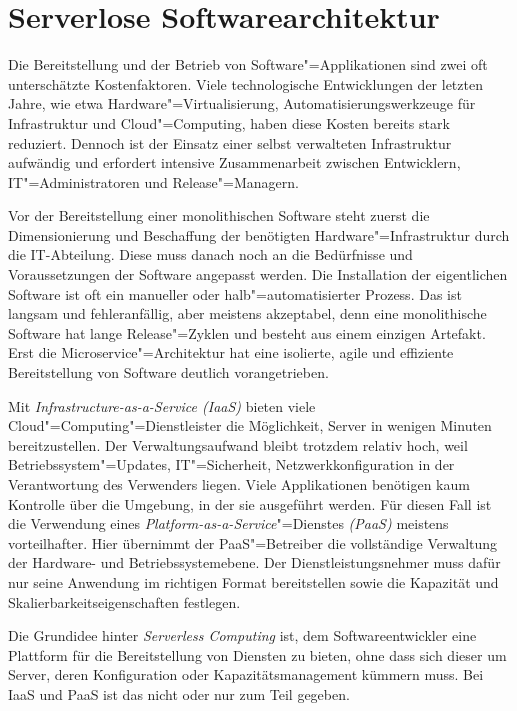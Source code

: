 \chapter{Serverlose Softwarearchitektur}
\label{chap:serverless}

Die Bereitstellung und der Betrieb von Software"=Applikationen sind zwei oft unterschätzte Kostenfaktoren. Viele technologische Entwicklungen der letzten Jahre, wie etwa Hardware"=Virtualisierung, Automatisierungswerkzeuge für Infrastruktur und Cloud"=Computing, haben diese Kosten bereits stark reduziert. Dennoch ist der Einsatz einer selbst verwalteten Infrastruktur aufwändig und erfordert intensive Zusammenarbeit zwischen Entwicklern, IT"=Administratoren und Release"=Managern.

Vor der Bereitstellung einer monolithischen Software steht zuerst die Dimensionierung und Beschaffung der benötigten Hardware"=Infrastruktur durch die IT-Abteilung. Diese muss danach noch an die Bedürfnisse und Voraussetzungen der Software angepasst werden. Die Installation der eigentlichen Software ist oft ein manueller oder halb"=automatisierter Prozess. Das ist langsam und fehleranfällig, aber meistens akzeptabel, denn eine monolithische Software hat lange Release"=Zyklen und besteht aus einem einzigen Artefakt. Erst die Microservice"=Architektur hat eine isolierte, agile und effiziente Bereitstellung von Software deutlich vorangetrieben.

Mit \textit{Infrastructure-as-a-Service (IaaS)} bieten viele Cloud"=Computing"=Dienstleister die Möglichkeit, Server in wenigen Minuten bereitzustellen. Der Verwaltungsaufwand bleibt trotzdem relativ hoch, weil Betriebssystem"=Updates, IT"=Sicherheit, Netzwerkkonfiguration \usw in der Verantwortung des Verwenders liegen. Viele Applikationen benötigen kaum Kontrolle über die Umgebung, in der sie ausgeführt werden. Für diesen Fall ist die Verwendung eines \textit{Platform-as-a-Service}"=Dienstes \textit{(PaaS)} meistens vorteilhafter. Hier übernimmt der PaaS"=Betreiber die vollständige Verwaltung der Hardware- und Betriebssystemebene. Der Dienstleistungsnehmer muss dafür nur seine Anwendung im richtigen Format bereitstellen sowie die Kapazität und Skalierbarkeitseigenschaften festlegen.

Die Grundidee hinter \textit{Serverless Computing} ist, dem Softwareentwickler eine Plattform für die Bereitstellung von Diensten zu bieten, ohne dass sich dieser um Server, deren Konfiguration oder Kapazitätsmanagement kümmern muss. Bei IaaS und PaaS ist das nicht oder nur zum Teil gegeben.

